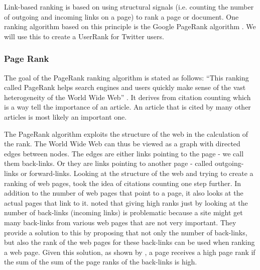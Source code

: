 Link-based ranking is based on using structural signals (i.e. counting the number of outgoing and incoming links on a page) to rank a page or document. One ranking algorithm based on this  principle is the Google PageRank algorithm \citep{Page1999}. We will use this to create a UserRank for Twitter users. 

\subsubsection{Page Rank}
The goal of the PageRank ranking algorithm is stated as follows: “This ranking called PageRank helps search engines and users quickly make sense of the vast heterogeneity of the World Wide Web” \citep[p. 1]{Page1999}. It derives from citation counting which is a way tell the importance of an article. An article that is cited by many other articles is most likely an important one. 

The PageRank algorithm exploits the structure of the web in the calculation of the rank. The World Wide Web can thus be viewed as a graph with directed edges between nodes. The edges are either links pointing to the page - we call them back-links. Or they are links pointing to another page - called outgoing-links or forward-links. Looking at the structure of the web and trying to create a ranking of web pages, \citet{Page1999}%
took the idea of citations counting one step further. In addition to the number of web pages that point to a page, it also looks at the actual pages that link to it. 
\citet{Page1999} noted that giving high ranks just by looking at the number of back-links (incoming links) is problematic because a site might get many back-links from various web pages that are not very important. They provide a solution to this by proposing that not only the number of back-links, but also the rank of the web pages for these back-links can be used when ranking a web page. Given this solution, as shown by \citet{Page1999}, a page receives a high page rank if the sum of the sum of the page ranks of the back-links is high.

